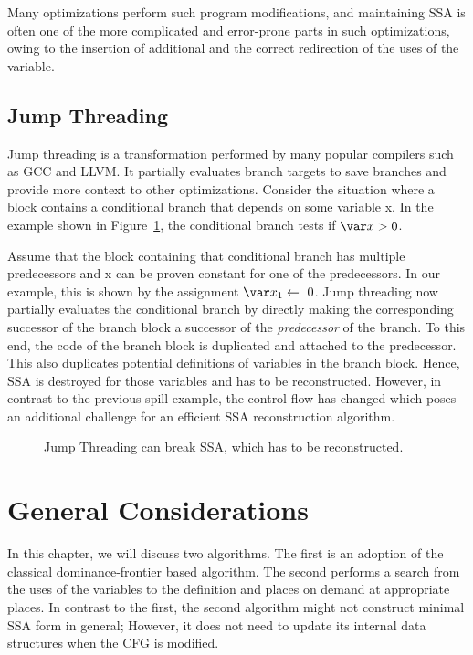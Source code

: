 {Many optimizations perform such program modifications, and 
maintaining SSA is often one of the more complicated and error-prone parts in 
such optimizations, owing to the insertion of additional \phifuns and the 
correct redirection of the uses of the variable.

\subsection{Jump Threading}

Jump threading is a transformation performed by many popular compilers such as GCC and LLVM.
It partially evaluates branch targets to save branches and provide more context to other optimizations.
Consider the situation where
a block contains a conditional branch that depends on some variable \var x.
In the example shown in Figure~\ref{fig:threading}, the conditional branch tests if $\var x> 0$.

Assume that the block containing that conditional branch has multiple predecessors and \var x can be proven constant for one of the predecessors.
In our example, this is shown by the assignment $\var x_1\gets~0$. 
Jump threading now partially evaluates the conditional branch by directly making the corresponding successor of the branch block a successor of the \emph{predecessor} of the branch.
To this end, the code of the branch block is duplicated and attached to the predecessor. 
This also duplicates potential definitions of variables in the branch block.
Hence, SSA is destroyed for those variables and has to be reconstructed. 
However, in contrast to the previous spill example, the control flow has 
changed which poses an additional challenge for an efficient SSA reconstruction 
algorithm. 

\begin{figure}[htbp]
  \begin{center}
    \hfill
    \hfill
  \end{center}
  \caption{Jump Threading can break SSA, which has to be reconstructed.}
  \label{fig:threading}
\end{figure}


\section{General Considerations}
In this chapter, we will discuss two algorithms.
The first is an adoption of the classical dominance-frontier based algorithm.
The second performs a search from the uses of the variables to the definition and places \phifuns on demand at appropriate places. 
In contrast to the first, the second algorithm might not construct minimal SSA 
form in general;
However, it does not need to update its internal data structures when the CFG is modified. 

}
